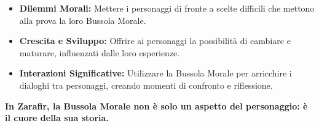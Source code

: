 \documentclass[../manuale_main.tex]{subfiles}
\begin{document}
\begin{itemize}
    \item \textbf{Dilemmi Morali:} Mettere i personaggi di fronte a scelte difficili che mettono alla prova la loro Bussola Morale.
    \item \textbf{Crescita e Sviluppo:} Offrire ai personaggi la possibilità di cambiare e maturare, influenzati dalle loro esperienze.
    \item \textbf{Interazioni Significative:} Utilizzare la Bussola Morale per arricchire i dialoghi tra personaggi, creando momenti di confronto e riflessione.
\end{itemize}

\vspace{0.3cm}

\textbf{In Zarafir, la Bussola Morale non è solo un aspetto del personaggio: è il cuore della sua storia.}
\end{document}
